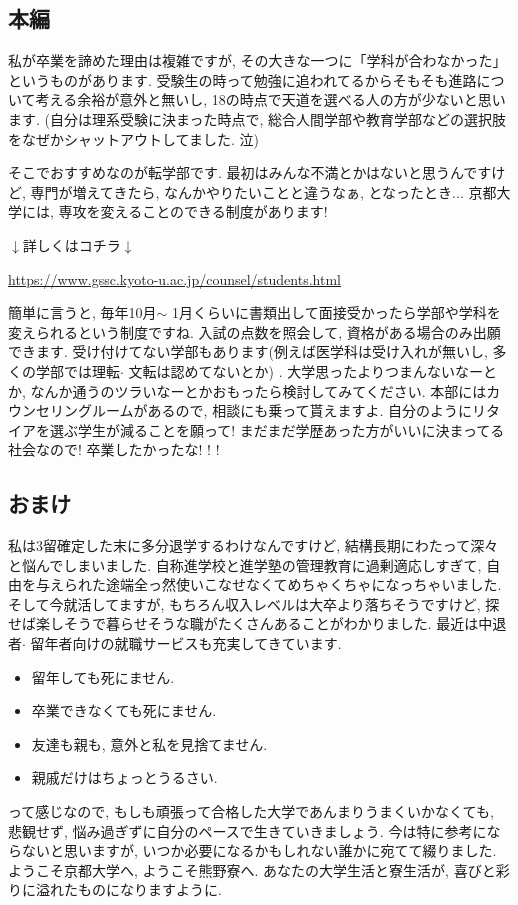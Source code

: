 \documentclass[10pt,b5jsbook,dvips,dvipdfmx,openany]{jsbook}
\theoremstyle{definition}
\begin{document}
		\subsection{本編}
		私が卒業を諦めた理由は複雑ですが, その大きな一つに「学科が合わなかった」というものがあります. 受験生の時って勉強に追われてるからそもそも進路について考える余裕が意外と無いし, 18の時点で天道を選べる人の方が少ないと思います. (自分は理系受験に決まった時点で, 総合人間学部や教育学部などの選択肢をなぜかシャットアウトしてました. 泣)

		そこでおすすめなのが転学部です. 最初はみんな不満とかはないと思うんですけど, 専門が増えてきたら, なんかやりたいことと違うなぁ, となったとき... 京都大学には, 専攻を変えることのできる制度があります!

		$\downarrow$詳しくはコチラ$\downarrow$

		\url{https://www.gssc.kyoto-u.ac.jp/counsel/students.html}

		簡単に言うと, 毎年10月$ \sim $ 1月くらいに書類出して面接受かったら学部や学科を変えられるという制度ですね. 入試の点数を照会して, 資格がある場合のみ出願できます. 受け付けてない学部もあります(例えば医学科は受け入れが無いし, 多くの学部では理転$ \cdot $ 文転は認めてないとか) . 大学思ったよりつまんないなーとか, なんか通うのツラいなーとかおもったら検討してみてください. 本部にはカウンセリングルームがあるので, 相談にも乗って貰えますよ. 自分のようにリタイアを選ぶ学生が減ることを願って! まだまだ学歴あった方がいいに決まってる社会なので! 卒業したかったな! ! !

		\subsection{おまけ}
		私は3留確定した末に多分退学するわけなんですけど, 結構長期にわたって深々と悩んでしまいました. 自称進学校と進学塾の管理教育に過剰適応しすぎて, 自由を与えられた途端全っ然使いこなせなくてめちゃくちゃになっちゃいました. そして今就活してますが, もちろん収入レベルは大卒より落ちそうですけど, 探せば楽しそうで暮らせそうな職がたくさんあることがわかりました. 最近は中退者$ \cdot $ 留年者向けの就職サービスも充実してきています.
		\begin{itemize}
		\item 留年しても死にません.
		\item 卒業できなくても死にません.
		\item 友達も親も, 意外と私を見捨てません.
		\item 親戚だけはちょっとうるさい.
		\end{itemize}
		って感じなので, もしも頑張って合格した大学であんまりうまくいかなくても, 悲観せず, 悩み過ぎずに自分のペースで生きていきましょう. 今は特に参考にならないと思いますが, いつか必要になるかもしれない誰かに宛てて綴りました.
        ようこそ京都大学へ, ようこそ熊野寮へ. あなたの大学生活と寮生活が, 喜びと彩りに溢れたものになりますように.
\end{document}
